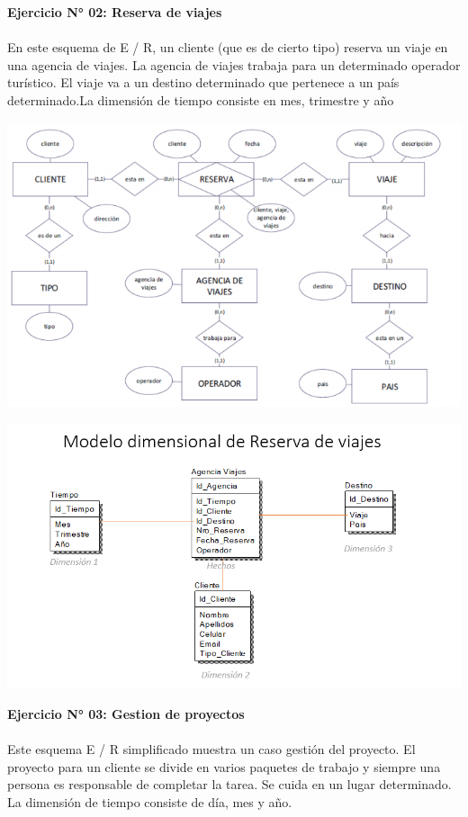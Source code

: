 \item{
\textbf{Ejercicio N° 02: Reserva de viajes}\\\\
En este esquema de E / R, un cliente (que es de cierto tipo) reserva un viaje en una agencia de viajes. La agencia de viajes trabaja para un determinado operador turístico. El viaje va a un destino determinado que pertenece a un país determinado.La dimensión de tiempo consiste en mes, trimestre y año

\begin{center}
\includegraphics[width=15cm]{./Imagenes/diagrama2}
\end{center}

\begin{center}
\includegraphics[width=15cm]{./Imagenes/dimension2}
\end{center}

\newpage

\item{
\textbf{Ejercicio N° 03: Gestion de proyectos}\\\\
Este esquema E / R simplificado muestra un caso gestión del proyecto.
El proyecto para un cliente se divide en varios paquetes de trabajo y siempre una persona es responsable de completar la
tarea. Se cuida en un lugar determinado.
La dimensión de tiempo consiste de día, mes y año.

}}
